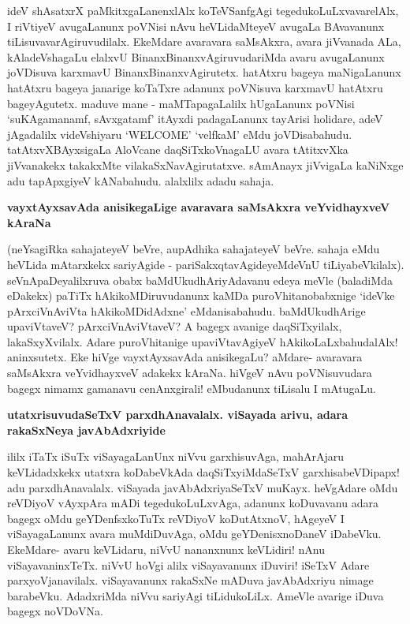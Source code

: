 \noindent
ideV shAsatxrX paMkitxgaLanenxlAlx koTeVSanfgAgi tegedukoLuLxvavarelAlx, I riVtiyeV avugaLanunx poVNisi nAvu heVLidaMteyeV avugaLa BAvavanunx tiLisuvavarAgiruvudilalx. EkeMdare avaravara saMsAkxra, avara jiVvanada ALa, kAladeVshagaLu elalxvU BinanxBinanxvAgiruvudariMda avaru avugaLanunx joVDisuva karxmavU BinanxBinanxvAgirutetx. hatAtxru bageya maNigaLanunx hatAtxru bageya janarige koTaTxre adanunx poVNisuva karxmavU hatAtxru bageyAgutetx. maduve mane - maMTapagaLalilx hUgaLanunx poVNisi `suKAgamanamf, sAvxgatamf' itAyxdi padagaLanunx tayArisi holidare, adeV jAgadalilx videVshiyaru {\rm `WELCOME'} `velfkaM' eMdu joVDisabahudu. tatAtxvXBAyxsigaLa AloVcane daqSiTxkoVnagaLU avara tAtitxvXka jiVvanakekx takakxMte vilakaSxNavAgirutatxve. sAmAnayx jiVvigaLa kaNiNxge adu tapApxgiyeV kANabahudu. alalxlilx adadu sahaja.

{\bigskip
\noindent
{\large\bf vayxtAyxsavAda anisikegaLige avaravara saMsAkxra veYvidhayxveV kAraNa}}\label{page176}
\medskip

\noindent
(neYsagiRka sahajateyeV beVre, aupAdhika sahajateyeV beVre. sahaja eMdu \hbox{heVLida} mAtarxkekx sariyAgide - pariSakxqtavAgideyeMdeVnU tiLiyabeVkilalx). seVnApaDeyalilxruva obabx baMdUkudhAriyAdavanu edeya meVle (baladiMda eDakekx) paTiTx hAkikoMDiruvudanunx kaMDa puroVhitanobabxnige `ideVke pArxciVnAviVta hAkikoMDidAdxne' eMdanisabahudu. baMdUkudhArige upaviVtaveV? pArxciVnAviVtaveV? A bagegx avanige daqSiTxyilalx, lakaSxyXvilalx. Adare puroVhitanige upaviVtavAgiyeV hAkikoLaLxbahudalAlx! aninxsutetx. Eke hiVge vayxtAyxsavAda anisikegaLu? aMdare- avaravara saMsAkxra veYvidhayxveV adakekx kAraNa. hiVgeV nAvu poVNisuvudara bagegx nimamx gamanavu cenAnxgirali! eMbudanunx tiLisalu I mAtugaLu.

{\bigskip
\noindent
{\large\bf utatxrisuvudaSeTxV parxdhAnavalalx. viSayada arivu, adara rakaSxNeya javAbAdxriyide}}\label{page176a}
\medskip

\noindent
ililx iTaTx iSuTx viSayagaLanUnx niVvu garxhisuvAga, mahArAjaru keVLidadxkekx utatxra koDabeVkAda daqSiTxyiMdaSeTxV garxhisabeVDipapx! adu parxdhAnavalalx. viSayada javAbAdxriyaSeTxV muKayx. heVgAdare oMdu reVDiyoV vAyxpAra mADi tegedukoLuLxvAga, adanunx koDuvavanu adara bagegx oMdu geYDenfsxkoTuTx reVDiyoV koDutAtxnoV, hAgeyeV I viSayagaLanunx avara muMdiDuvAga, oMdu geYDenisxnoDaneV iDabeVku. EkeMdare- avaru keVLidaru, niVvU nananxnunx keVLidiri! nAnu viSayavaninxTeTx. niVvU hoVgi alilx viSayavanunx iDuviri! iSeTxV Adare parxyoVjanavilalx. viSayavanunx rakaSxNe mADuva javAbAdxriyu nimage barabeVku. AdadxriMda niVvu sariyAgi tiLidukoLiLx. AmeVle avarige iDuva bagegx noVDoVNa.

